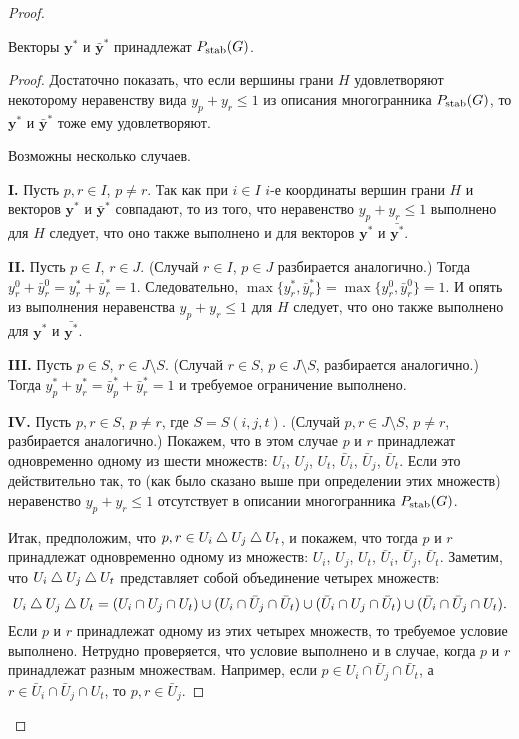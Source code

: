 \begin{proof}
\begin{lemma}
	Векторы $\bm{y^*}$ и $\bm{\bar{y}^*}$ принадлежат $P_{\textup{stab}}(G)$.
\end{lemma}
\begin{proof}
	Достаточно показать, что если вершины грани $H$ удовлетворяют некоторому неравенству вида $y_p + y_r \le 1$ из описания многогранника $P_{\textup{stab}}(G)$, то $\bm{y^*}$ и $\bm{\bar{y}^*}$ тоже ему удовлетворяют.
	
	Возможны несколько случаев.
	
	\textbf{I.} Пусть $p,r\in I$, $p \ne r$.
	Так как при $i \in I$ $i$-е координаты вершин грани $H$ и векторов $\bm{y^*}$ и $\bm{\bar{y}^*}$ совпадают, то из того, что неравенство $y_p + y_r \le 1$  выполнено для $H$ следует, что оно также выполнено и для векторов $\bm{y^*}$ и $\bm{\bar{y^*}}$.
	
	\textbf{II.} Пусть $p \in I$, $r \in J$.
	(Случай $r \in I$, $p \in J$ разбирается аналогично.)
	Тогда $y^0_r + \bar{y}^0_r = y^*_r + \bar{y}^*_r = 1$.
	Следовательно, $\max\{y^*_r, \bar{y}^*_r\} = \max\{y^0_r, \bar{y}^0_r\} = 1$.
	И опять из выполнения неравенства $y_p + y_r \le 1$ для $H$ следует, что оно также выполнено для $\bm{y^*}$ и $\bm{\bar{y^*}}$.
	
	\textbf{III.} Пусть $p \in S$, $r \in J\setminus S$.
	(Случай $r \in S$, $p \in J\setminus S$, разбирается аналогично.)
	Тогда $y^*_p + y^*_r = \bar{y}^*_p + \bar{y}^*_r = 1$ и требуемое ограничение выполнено.
	
	\textbf{IV.} Пусть $p,r \in S$, $p \ne r$, где $S = S(i,j,t)$.
	(Случай $p,r \in J \setminus S$, $p \ne r$, разбирается аналогично.)
	Покажем, что в этом случае $p$ и $r$ принадлежат одновременно одному из шести множеств:
	$U_i$, $U_j$, $U_t$, $\bar{U}_i$, $\bar{U}_j$, $\bar{U}_t$.
	Если это действительно так, то (как было сказано выше при определении этих множеств) неравенство $y_p + y_r \le 1$ отсутствует в описании многогранника $P_{\textup{stab}}(G)$.
	
	Итак, предположим, что $p,r \in U_i \bigtriangleup U_j \bigtriangleup U_t$, и покажем, что тогда $p$ и $r$ принадлежат одновременно одному из множеств:
	$U_i$, $U_j$, $U_t$, $\bar{U}_i$, $\bar{U}_j$, $\bar{U}_t$.
	Заметим, что $U_i \bigtriangleup U_j \bigtriangleup U_t$ представляет собой объединение четырех множеств:
	\[
	U_i \bigtriangleup U_j \bigtriangleup U_t = (U_i \cap U_j \cap U_t) \cup (U_i \cap \bar{U}_j \cap \bar{U}_t) \cup (\bar{U}_i \cap U_j \cap \bar{U}_t) \cup (\bar{U}_i \cap \bar{U}_j \cap U_t).
	\]
	Если $p$ и $r$ принадлежат одному из этих четырех множеств, то требуемое условие выполнено.
	Нетрудно проверяется, что условие выполнено и в случае, когда $p$ и $r$ принадлежат разным множествам.
	Например, если $p \in U_i \cap \bar{U}_j \cap \bar{U}_t$, а $r \in \bar{U}_i \cap \bar{U}_j \cap U_t$, то $p,r \in \bar{U}_j$.
\end{proof}


\end{proof}
